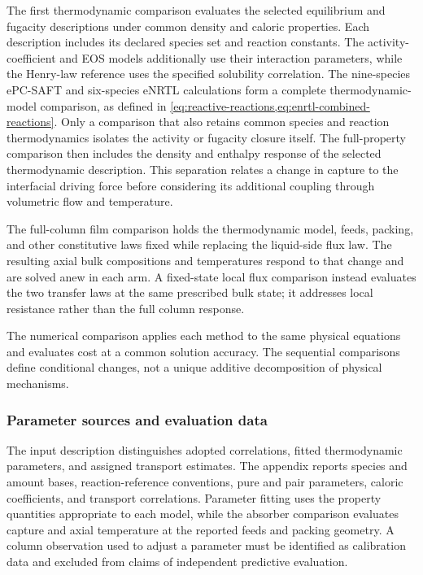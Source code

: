 The first thermodynamic comparison evaluates the selected equilibrium and fugacity descriptions under common density and caloric properties.
Each description includes its declared species set and reaction constants.
The activity-coefficient and EOS models additionally use their interaction parameters, while the Henry-law reference uses the specified solubility correlation.
The nine-species ePC-SAFT and six-species eNRTL calculations form a complete thermodynamic-model comparison, as defined in \cref{eq:reactive-reactions,eq:enrtl-combined-reactions}.
Only a comparison that also retains common species and reaction thermodynamics isolates the activity or fugacity closure itself.
The full-property comparison then includes the density and enthalpy response of the selected thermodynamic description.
This separation relates a change in capture to the interfacial driving force before considering its additional coupling through volumetric flow and temperature.

The full-column film comparison holds the thermodynamic model, feeds, packing, and other constitutive laws fixed while replacing the liquid-side flux law.
The resulting axial bulk compositions and temperatures respond to that change and are solved anew in each arm.
A fixed-state local flux comparison instead evaluates the two transfer laws at the same prescribed bulk state; it addresses local resistance rather than the full column response.

The numerical comparison applies each method to the same physical equations and evaluates cost at a common solution accuracy.
The sequential comparisons define conditional changes, not a unique additive decomposition of physical mechanisms.

\subsubsection{Parameter sources and evaluation data}\label{subsec:parameter-sources}
The input description distinguishes adopted correlations, fitted thermodynamic parameters, and assigned transport estimates.
The appendix reports species and amount bases, reaction-reference conventions, pure and pair parameters, caloric coefficients, and transport correlations.
Parameter fitting uses the property quantities appropriate to each model, while the absorber comparison evaluates capture and axial temperature at the reported feeds and packing geometry.
A column observation used to adjust a parameter must be identified as calibration data and excluded from claims of independent predictive evaluation.

